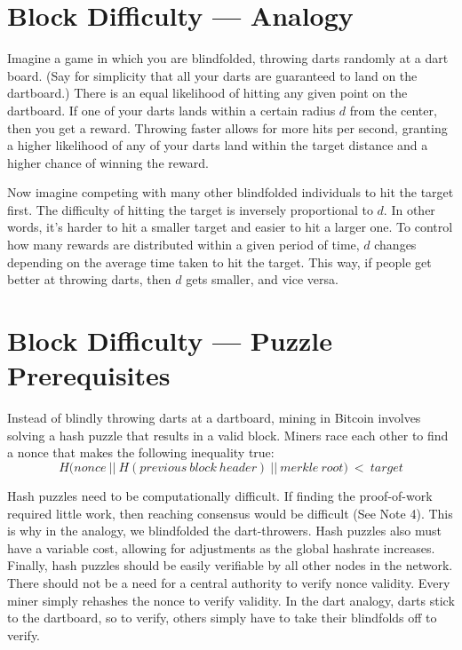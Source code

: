 \documentclass[11pt]{article}
\begin{document}
    \section*{Block Difficulty --- Analogy}
    
    Imagine a game in which you are blindfolded, throwing darts randomly at a dart board. (Say for simplicity that all your darts are guaranteed to land on the dartboard.) There is an equal likelihood of hitting any given point on the dartboard. If one of your darts lands within a certain radius $d$ from the center, then you get a reward. Throwing faster allows for more hits per second, granting a higher likelihood of any of your darts land within the target distance and a higher chance of winning the reward. 
    
    Now imagine competing with many other blindfolded individuals to hit the target first. The difficulty of hitting the target is inversely proportional to $d$. In other words, it's harder to hit a smaller target and easier to hit a larger one. To control how many rewards are distributed within a given period of time, $d$ changes depending on the average time taken to hit the target. This way, if people get better at throwing darts, then $d$ gets smaller, and vice versa.
    
    \section*{Block Difficulty --- Puzzle Prerequisites}
    
    Instead of blindly throwing darts at a dartboard, mining in Bitcoin involves solving a hash puzzle that results in a valid block. Miners race each other to find a nonce that makes the following inequality true:
    $$H\big(nonce~||~H(previous~block~header)~||~merkle~root\big)~<~target$$
    
    Hash puzzles need to be computationally difficult. If finding the proof-of-work required little work, then reaching consensus would be difficult (See Note 4). This is why in the analogy, we blindfolded the dart-throwers. Hash puzzles also must have a variable cost, allowing for adjustments as the global hashrate increases. Finally, hash puzzles should be easily verifiable by all other nodes in the network. There should not be a need for a central authority to verify nonce validity. Every miner simply rehashes the nonce to verify validity. In the dart analogy, darts stick to the dartboard, so to verify, others simply have to take their blindfolds off to verify.
    
\end{document}
